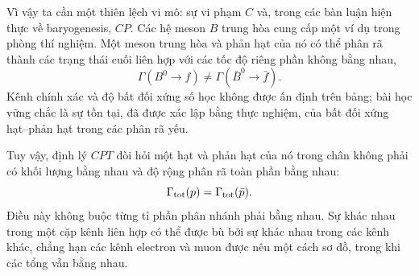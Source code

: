 \begin{classroomqa}
\end{classroomqa}

Vì vậy ta cần một thiên lệch vi mô: sự vi phạm \(C\) và, trong các bàn luận hiện thực về baryogenesis, \(CP\). Các hệ meson \(B\) trung hòa cung cấp một ví dụ trong phòng thí nghiệm. Một meson trung hòa và phản hạt của nó có thể phân rã thành các trạng thái cuối liên hợp với các tốc độ riêng phần không bằng nhau,
\begin{equation}
\Gamma(B^0\to f)\ne\Gamma(\bar B^0\to\bar f).
\label{eq:c08-cp-partial}
\end{equation}
Kênh chính xác và độ bất đối xứng số học không được ấn định trên bảng; bài học vững chắc là sự tồn tại, đã được xác lập bằng thực nghiệm, của bất đối xứng hạt--phản hạt trong các phân rã yếu.

Tuy vậy, định lý \(CPT\) đòi hỏi một hạt và phản hạt của nó trong chân không phải có khối lượng bằng nhau và độ rộng phân rã toàn phần bằng nhau:
\begin{equation}
\Gamma_{\rm tot}(p)=\Gamma_{\rm tot}(\bar p).
\end{equation}
Điều này không buộc từng tỉ phần phân nhánh phải bằng nhau. Sự khác nhau trong một cặp kênh liên hợp có thể được bù bởi sự khác nhau trong các kênh khác, chẳng hạn các kênh electron và muon được nêu một cách sơ đồ, trong khi các tổng vẫn bằng nhau.

\begin{classroomqa}
\end{classroomqa}

